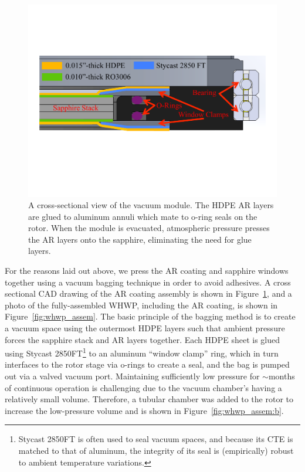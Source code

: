 \begin{figure}[!t]
    \centering
    \includegraphics[width=0.8\linewidth, trim=1cm 7cm 2cm 6cm, clip]{PB2aWHWP/Figures/pb2a_whwp_ar_coating_vacuum_bag.pdf}
    \caption{A cross-sectional view of the vacuum module. The HDPE AR layers are glued to aluminum annuli which mate to o-ring seals on the rotor. When the module is evacuated, atmospheric pressure presses the AR layers onto the sapphire, eliminating the need for glue layers.}
    \label{fig:pb2a_whwp_vacuum_bagging}
\end{figure}

For the reasons laid out above, we press the AR coating and sapphire windows together using a vacuum bagging technique in order to avoid adhesives. A cross sectional CAD drawing of the AR coating assembly is shown in Figure~\ref{fig:pb2a_whwp_vacuum_bagging}, and a photo of the fully-assembled WHWP, including the AR coating, is shown in Figure~\ref{fig:whwp_assem}. The basic principle of the bagging method is to create a vacuum space using the outermost HDPE layers such that ambient pressure forces the sapphire stack and AR layers together. Each HDPE sheet is glued using Stycast 2850FT\footnote{Stycast 2850FT is often used to seal vacuum spaces, and because its CTE is matched to that of aluminum, the integrity of its seal is (empirically) robust to ambient temperature variations.} to an aluminum ``window clamp'' ring, which in turn interfaces to the rotor stage via o-rings to create a seal, and the bag is pumped out via a valved vacuum port. Maintaining sufficiently low pressure for $\sim$months of continuous operation is challenging due to the vacuum chamber's having a relatively small volume. Therefore, a tubular chamber was added to the rotor to increase the low-pressure volume and is shown in Figure~\ref{fig:whwp_assem:b}.

